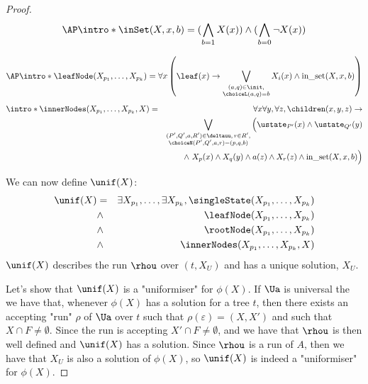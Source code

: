 \documentclass[a4paper,UKenglish,cleveref, autoref, thm-restate]{lipics-v2021}
\begin{document}
\begin{proof}
	\begin{equation*}
		\AP \intro* \inSet (X, x, b)  = (\bigwedge_{b = 1}  X(x)) \land (\bigwedge_{b = 0}  \lnot X(x))
	\end{equation*}

	\begin{equation*}
		\AP \intro* \leafNode (X_{p_1}, \ldots, X_{p_k})  = \forall x \left( \leaf(x) \rightarrow \bigvee_{\substack{(a, q) \in \init,\\ \choiceL(a,q) = b}} X_i(x) \land  \text{in\_set}(X,x,b)  \right)
	\end{equation*}
	\AP
	\begin{eqnarray*}
		\intro* \innerNodes (X_{p_1}, \ldots, X_{p_k}, X)  &=& \forall x \forall y, \forall z, \children (x,y,z) \ra \\
		&& \bigvee_{ \substack{(P',Q',a,R')\in \deltauu, \, r \in R', \\ \choiceN(P',Q',a,r) = (p,q,b)}} \Big( \ustate_{P'}(x) \land \ustate_{Q'}(y) \\
		&& \qquad \land \  X_p(x) \land X_q(y) \land a(z) \land X_r(z) \land  \text{in\_set}(X,x,b)\Big)
	\end{eqnarray*}


	We can now define $\unif(X)$:
	\begin{eqnarray*}
		\unif (X) &=& \exists X_{p_1}, \ldots, \exists X_{p_k}, \singleState (X_{p_1}, \ldots, X_{p_k}) \\
		&\land& \leafNode (X_{p_1}, \ldots, X_{p_k})\\
		&\land& \rootNode (X_{p_1}, \ldots, X_{p_k})\\
		&\land& \innerNodes (X_{p_1}, \ldots, X_{p_k}, X)
	\end{eqnarray*}
	$\unif(X)$ describes the run $\rhou$ over $(t,X_U)$ and has a unique solution, $X_U$.

	Let's show that $\unif(X)$ is a "uniformiser" for $\phi(X)$.
	If $\Ua$ is universal the we have that, whenever $\phi(X)$ has a solution for a tree $t$, then there exists an accepting "run" $\rho$ of $\Ua$ over $t$
	such that $\rho(\varepsilon) = (X,X')$ and such that $X \cap F \neq \emptyset$. Since the run is accepting $X' \cap F \neq \emptyset$, and we have that
	$\rhou$ is then well defined and $\unif(X)$ has a solution. Since $\rhou$ is a run of $A$, then we have that $X_U$ is also a solution of $\phi(X)$, so
	$\unif(X)$ is indeed a "uniformiser" for $\phi(X)$.

\end{proof}
\end{document}
